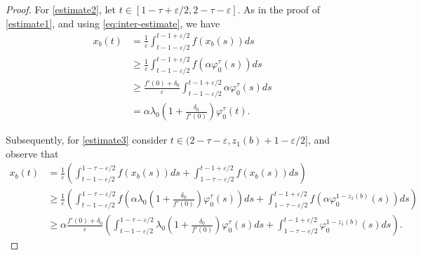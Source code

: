 \documentclass[a4paper,11pt]{article}
\theoremstyle{plain}
\theoremstyle{definition}
\theoremstyle{definition}
\numberwithin{equation}{section}
\begin{document}
\begin{proof}
For \eqref{estimate2}, let $t\in[1-\tau+\varepsilon/2,2-\tau-\varepsilon]$. As in the proof of \eqref{estimate1}, and using \eqref{eq:inter-estimate}, we have
\begin{align*}
    x_b(t) &= \frac{1}{\varepsilon} \int_{t-1-\varepsilon/2}^{t-1+\varepsilon/2} f(x_b(s)) ds \\
    & \geq \frac{1}{\varepsilon} \int_{t-1-\varepsilon/2}^{t-1+\varepsilon/2} f(\alpha\varphi_0^\tau(s)) ds \\
    &\geq \frac{f'(0)+\delta_0}{\varepsilon} \int_{t-1-\varepsilon/2}^{t-1+\varepsilon/2} \alpha\varphi_0^\tau(s) ds \\
    &=\alpha\lambda_0\left( 1+\frac{\delta_0}{f'(0)} \right)\varphi_0^\tau(t).
\end{align*}

Subsequently, for \eqref{estimate3} consider $t\in(2-\tau-\varepsilon,z_1(b)+1-\varepsilon/2]$, and observe that
\begin{align*}
    x_b(t) &= \frac{1}{\varepsilon} \left( \int_{t-1-\varepsilon/2}^{1-\tau-\varepsilon/2} f(x_b(s)) ds + \int_{1-\tau-\varepsilon/2}^{t-1+\varepsilon/2} f(x_b(s)) ds \right) \\
    &\geq \frac{1}{\varepsilon} \left( \int_{t-1-\varepsilon/2}^{1-\tau-\varepsilon/2} f\left( \alpha\lambda_0\left( 1+\frac{\delta_0}{f'(0)}\right)\varphi_0^\tau(s) \right) ds + \int_{1-\tau-\varepsilon/2}^{t-1+\varepsilon/2} f(\alpha\varphi_0^{1-z_1(b)}(s)) ds \right) \\
    &\geq \alpha\frac{f'(0)+\delta_0}{\varepsilon} \left( \int_{t-1-\varepsilon/2}^{1-\tau-\varepsilon/2} \lambda_0\left( 1+\frac{\delta_0}{f'(0)}\right)\varphi_0^\tau(s) ds + \int_{1-\tau-\varepsilon/2}^{t-1+\varepsilon/2} \varphi_0^{1-z_1(b)}(s) ds \right).
\end{align*}


\end{proof}
\end{document}
